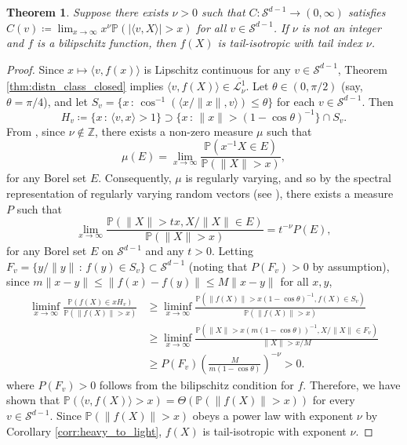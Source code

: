 \documentclass[twoside]{article}
\newtheorem{theorem}{Theorem}
\theoremstyle{definition}
\theoremstyle{remark}
\begin{document}
{\begin{theorem}
Suppose there exists $\nu > 0$ such that $C:\mathcal{S}^{d-1}\to(0,\infty)$ satisfies $C(v) \coloneqq \lim_{x \to \infty}x^{\nu}\mathbb{P}(|\langle v, X\rangle| > x)$ for all $v \in \mathcal{S}^{d-1}$. If $\nu$ is not an integer and $f$ is a bilipschitz function,
then $f(X)$ is tail-isotropic with tail index $\nu$. 
\end{theorem}
\begin{proof}
Since $x \mapsto \langle v, f(x)\rangle$ is Lipschitz continuous for any $v \in \mathcal{S}^{d-1}$, Theorem \ref{thm:distn_class_closed} implies $\langle v, f(X)\rangle \in \overline{\mathcal{L}_{\nu}^{1}}$. Let $\theta \in (0,\pi/2)$ (say, $\theta = \pi / 4$), and let $S_v = \{x\, : \, \cos^{-1}(\langle x/\|x\|, v\rangle)\leq\theta\}$ for each $v \in \mathcal{S}^{d-1}$. Then
\[
H_v \coloneqq \{x\,:\,\langle v, x \rangle > 1\} \supset \{x\,:\,\|x\| > (1-\cos\theta)^{-1}\} \cap S_v.
\]
From \cite[Theorem C.2.1]{buraczewski2016stochastic}, since $\nu \not \in \mathbb{Z}$, there exists a non-zero measure $\mu$ such that
\[
\mu(E) = \lim_{x \to \infty} \frac{\mathbb{P}(x^{-1}X \in E)}{\mathbb{P}(\|X\| > x)},
\]
for any Borel set $E$. Consequently, $\mu$ is regularly varying, and so 
by the spectral representation of regularly varying random vectors (see \cite[pg. 281]{buraczewski2016stochastic}), there exists a measure $P$ such that
\[
\lim_{x \to \infty}\frac{\mathbb{P}(\|X\|>tx, X/\|X\| \in E)}{\mathbb{P}(\|X\| > x)} = t^{-\nu} P(E),
\]
for any Borel set $E$ on $\mathcal{S}^{d-1}$ and any $t > 0$. Letting $F_v = \{y / \|y\|\,:\, f(y) \in S_v\} \subset \mathcal{S}^{d-1}$ (noting that $P(F_v) > 0$ by assumption), since $m\|x - y\| \leq \|f(x) - f(y)\| \leq M\|x - y\|$ for all $x,y$,
\begin{align*}
\liminf_{x \to \infty}
\frac{\mathbb{P}(f(X) \in x H_v)}{\mathbb{P}(\|f(X)\| > x)} 
&\geq \liminf_{x \to \infty}\frac{\mathbb{P}(\|f(X)\| > x(1-\cos\theta)^{-1}, f(X) \in S_v)}{\mathbb{P}(\|f(X)\| > x)} \\
&\geq \liminf_{x \to \infty}\frac{\mathbb{P}(\|X\| > x(m(1-\cos\theta))^{-1}, X/\|X\| \in F_v)}{\|X\| > x / M} \\
&\geq P(F_v) \left(\frac{M}{m(1-\cos\theta)}\right)^{-\nu} > 0.
\end{align*}
where $P(F_v) > 0$ follows from the bilipschitz condition for $f$. Therefore, we have shown that $\mathbb{P}(\langle v, f(X)\rangle > x) = \Theta(\mathbb{P}(\|f(X)\| > x))$ for every $v \in \mathcal{S}^{d-1}$.
Since $\mathbb{P}(\|f(X)\| > x)$ obeys a power law with exponent $\nu$ by Corollary \ref{corr:heavy_to_light}, $f(X)$ is tail-isotropic with exponent $\nu$.
\end{proof}

}
\end{document}
